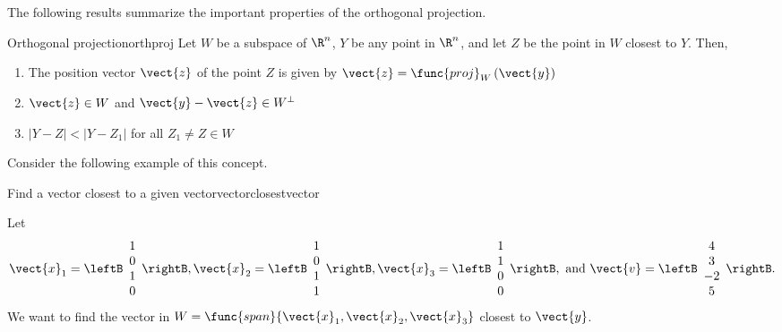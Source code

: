 The following results summarize the important properties of the orthogonal projection. 

\begin{theorem}{Orthogonal projection}{orthproj}
Let $W$ be a subspace of $\R^n$, $Y$ be any point in $\R^n$, and let $Z$ be the point in $W$ closest to $Y$. Then, 
\begin{enumerate}
\item 
The position vector $\vect{z}$ of the point $Z$ is given by $\vect{z} = \func{proj}_{W}\left( \vect{y}\right)$
\item
$\vect{z} \in W$ and $\vect{y} - \vect{z} \in W^{\perp}$
\item
$| Y - Z | < | Y - Z_1 |$ for all $Z_1 \neq Z \in W$
\end{enumerate}
\end{theorem}

Consider the following example of this concept.

\begin{example}{Find a vector closest to a given vector}{vectorclosestvector}

Let
\[ \vect{x}_1=\leftB\begin{array}{c} 1\\ 0\\ 1\\ 0 \end{array}\rightB,
\vect{x}_2=\leftB\begin{array}{c} 1\\ 0\\ 1\\ 1 \end{array}\rightB,
\vect{x}_3=\leftB\begin{array}{c} 1\\ 1\\ 0\\ 0 \end{array}\rightB,
\mbox{ and }
\vect{v}=\leftB\begin{array}{c} 4\\ 3\\ -2\\ 5 \end{array}\rightB. \]
We want to find the vector in
$W =\func{span}\{\vect{x}_1, \vect{x}_2,\vect{x}_3\}$
closest to $\vect{y}$.
\end{example}

